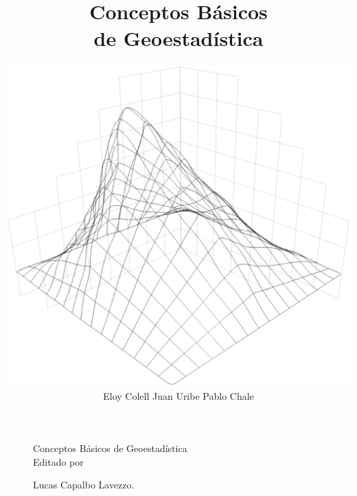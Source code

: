 \documentclass[b5paper,10pt]{book}
\begin{document}
\begin{titlepage}
\title{\centering \fontsize{28}{28} \selectfont Conceptos Básicos\\ de Geoestadística}
\author{\includegraphics[scale=0.28]{image/logo.eps}\vspace*{1in}\\Eloy Colell \hfill Juan Uribe \hfill Pablo Chale}
\date{}
\maketitle
\thispagestyle{empty}
\end{titlepage}

\begin{titlepage}
\begin{figure}[b]
{\centering \fontsize{18}{18} \selectfont Conceptos Básicos de Geoestadística}
\\

Editado por

Lucas Capalbo Lavezzo.
\end{figure}
\end{titlepage}



\tableofcontents{}





\listoffigures















\end{document}
